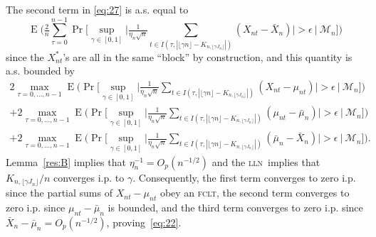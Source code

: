 \documentclass[11pt]{article}
\theoremstyle{definition}
\DeclareMathOperator{\E}{E}
\DeclareMathOperator{\pr}{Pr}
\newcommand{\fclt}{\textsc{fclt}}
\newcommand{\lln}{\textsc{lln}}
\begin{document}
  The second term in \eqref{eq:27} is a.s. equal to
  \begin{equation*}
    \E\Big( \tfrac{2}{n} \sum_{\tau=0}^{n-1} \pr\Big[\sup_{\gamma \in
      [0,1]} \Big\lvert \tfrac{1}{\eta_n \sqrt{n}} \sum_{t \in I(\tau, |\lfloor
      \gamma n \rfloor - K_{n,\lfloor \gamma J_n \rfloor}|)} (X_{nt} -
    \bar X_n) \Big\rvert > \epsilon \ \Big|\ \mathcal{M}_n\Big]\Big)
  \end{equation*}
  since the $X_{nt}^{*}$'s are all in the same ``block'' by
  construction, and this quantity is a.s. bounded by
  \begin{multline}\label{eq:24}
    2 \max_{\tau=0,\dots,n-1} \E \Big(\pr\Big[\sup_{\gamma \in [0,1]} \Big\lvert
    \tfrac{1}{\eta_n \sqrt{n}} \sum_{t \in I(\tau, |\lfloor \gamma n
      \rfloor - K_{n,\lfloor \gamma J_n \rfloor}|)} (X_{nt} -
    \mu_{nt}) \Big\rvert > \epsilon \ \Big|\ \mathcal{M}_n\Big]\Big) \\+ 2
    \max_{\tau=0,\dots,n-1}\E \Big(\pr\Big[\sup_{\gamma \in [0,1]} \Big\lvert
    \tfrac{1}{\eta_n \sqrt{n}} \sum_{t \in I(\tau, |\lfloor \gamma n
      \rfloor - K_{n,\lfloor \gamma J_n \rfloor}|)} (\mu_{nt} - \bar
    \mu_n) \Big\rvert > \epsilon \ \Big|\ \mathcal{M}_n\Big]\Big) \\+ 2
    \max_{\tau=0,\dots,n-1}\E\Big( \pr\Big[\sup_{\gamma \in [0,1]} \Big\lvert
    \tfrac{1}{\eta_n \sqrt{n}} \sum_{t \in I(\tau, |\lfloor \gamma n
      \rfloor - K_{n,\lfloor \gamma J_n \rfloor}|)} (\bar \mu_{n} -
    \bar X_n) \Big\rvert > \epsilon \ \Big|\ \mathcal{M}_n\Big]\Big).
  \end{multline}
  Lemma~\ref{res:B} implies that $\eta_n^{-1} = O_p(n^{-1/2})$ and the
  \lln\ implies that $K_{n,\lfloor \gamma J_n\rfloor}/n$ converges
  i.p.  to $\gamma$.  Consequently, the first term converges to zero
  i.p. since the partial sums of $X_{nt} - \mu_{nt}$ obey an \fclt, the
  second term converges to zero i.p. since $\mu_{nt}-\bar{\mu}_n$ is
  bounded, and the third term converges to zero i.p. since $\bar{X}_n
  - \bar{\mu}_n = O_p(n^{-1/2})$, proving~\eqref{eq:22}.
\end{document}
